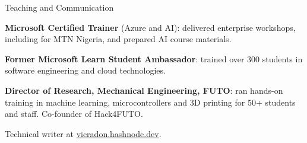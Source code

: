 \documentclass{resume}
\begin{document}
\begin{rSection}{Teaching and Communication}
\item \textbf{Microsoft Certified Trainer} (Azure and AI): delivered enterprise workshops, including for MTN Nigeria, and prepared AI course materials.
\item \textbf{Former Microsoft Learn Student Ambassador}: trained over 300 students in software engineering and cloud technologies.
\item \textbf{Director of Research, Mechanical Engineering, FUTO}: ran hands-on training in machine learning, microcontrollers and 3D printing for 50+ students and staff. Co-founder of Hack4FUTO.
\item Technical writer at \href{https://vicradon.hashnode.dev/}{vicradon.hashnode.dev}.
\end{rSection}
\end{document}
